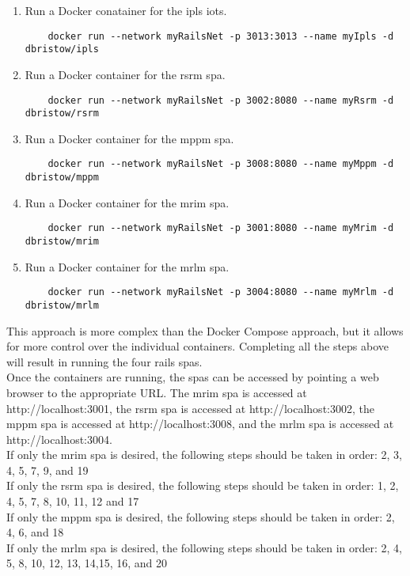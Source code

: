 \begin{enumerate}
\begin{verbatim}
    \end{verbatim}
    \item Run a Docker conatainer for the \gls{ipls} \gls{iots}.
    \begin{verbatim}
    docker run --network myRailsNet -p 3013:3013 --name myIpls -d dbristow/ipls
    \end{verbatim}
    \item Run a Docker container for the \gls{rsrm} \gls{spa}.
    \begin{verbatim}
    docker run --network myRailsNet -p 3002:8080 --name myRsrm -d dbristow/rsrm
    \end{verbatim}
    \item Run a Docker container for the \gls{mppm} \gls{spa}.
    \begin{verbatim}
    docker run --network myRailsNet -p 3008:8080 --name myMppm -d dbristow/mppm
    \end{verbatim}
    \item Run a Docker container for the \gls{mrim} \gls{spa}.
    \begin{verbatim}
    docker run --network myRailsNet -p 3001:8080 --name myMrim -d dbristow/mrim
    \end{verbatim}
    \item Run a Docker container for the \gls{mrlm} \gls{spa}.
    \begin{verbatim}
    docker run --network myRailsNet -p 3004:8080 --name myMrlm -d dbristow/mrlm
    \end{verbatim}
\end{enumerate}
This approach is more complex than the Docker Compose approach, but it allows for more control over the individual containers. Completing all the steps above will result in running the four \gls{rails} \glspl{spa}.\vspace{5mm}\\
Once the containers are running, the \glspl{spa} can be accessed by pointing a web browser to the appropriate URL. The \gls{mrim} \gls{spa} is accessed at http://localhost:3001, the \gls{rsrm} \gls{spa} is accessed at http://localhost:3002, the \gls{mppm} \gls{spa} is accessed at http://localhost:3008, and the \gls{mrlm} \gls{spa} is accessed at http://localhost:3004.\vspace{5mm}\\  
If only the \gls{mrim} \gls{spa} is desired, the following steps should be taken in order: 2, 3, 4, 5, 7, 9, and 19\\
If only the \gls{rsrm} \gls{spa} is desired, the following steps should be taken in order: 1, 2, 4, 5, 7, 8, 10, 11, 12 and 17\\
If only the \gls{mppm} \gls{spa} is desired, the following steps should be taken in order: 2, 4, 6, and 18\\
If only the \gls{mrlm} \gls{spa} is desired, the following steps should be taken in order: 2, 4, 5, 8, 10, 12, 13, 14,15, 16, and 20\\
